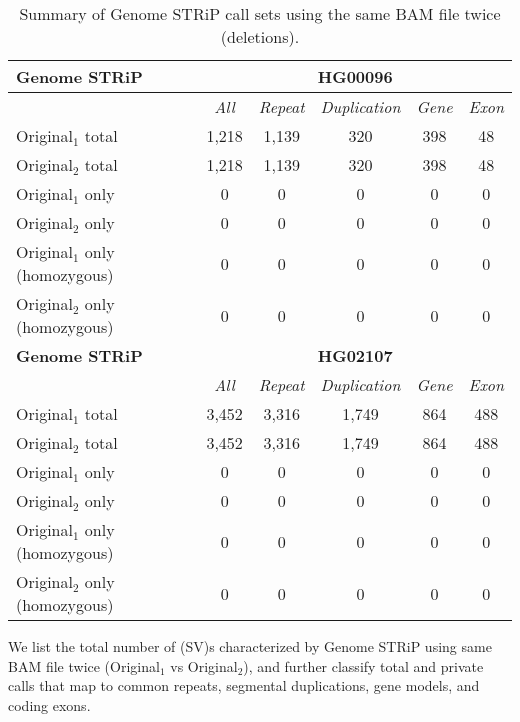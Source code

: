 \begin{table}[htb]
\caption{ Summary of Genome STRiP call sets using the same BAM file twice (deletions). }
\begin{center}
\begin{tabular}{|l|c||c|c|c|c|}
\hline
{\bf Genome STRiP} & \multicolumn{5}{|c|}{\bf HG00096} \\
\hline
\cline{2-6}
{\bf} & {\it All} & {\it Repeat} & {\it Duplication} & {\it Gene} & {\it Exon} \\
\hline
Original$_1$ total & 1,218 & 1,139 & 320 & 398 & 48 \\
\hline
Original$_2$ total & 1,218 & 1,139 & 320 & 398 & 48 \\
\hline
Original$_1$ only & 0 & 0 & 0 & 0 & 0\\ 
\hline
Original$_2$ only & 0 & 0 & 0 & 0 & 0\\
\hline
Original$_1$ only (homozygous) & 0 & 0 & 0 & 0 & 0\\ 
\hline
Original$_2$ only (homozygous) & 0 & 0 & 0 & 0 & 0\\  
\hline
\hline
{\bf Genome STRiP} & \multicolumn{5}{|c|}{\bf HG02107} \\
\hline
\cline{2-6}
{\bf} & {\it All} & {\it Repeat} & {\it Duplication} & {\it Gene} & {\it Exon} \\
\hline
Original$_1$ total & 3,452 & 3,316 & 1,749 & 864 & 488 \\
\hline
Original$_2$ total & 3,452 & 3,316 & 1,749 & 864 & 488 \\
\hline
Original$_1$ only & 0 & 0 & 0 & 0 & 0\\ 
\hline
Original$_2$ only & 0 & 0 & 0 & 0 & 0\\
\hline
Original$_1$ only (homozygous) & 0 & 0 & 0 & 0 & 0\\ 
\hline
Original$_2$ only (homozygous) & 0 & 0 & 0 & 0 & 0\\  
\hline
\end{tabular}
\end{center}
{\footnotesize We list the total number of (SV)s characterized by Genome STRiP using same BAM file twice (Original$_1$ vs Original$_2$), 
and further classify total and private calls that map to common repeats, segmental duplications, gene models, and coding exons.}
\label{supptab:orig-vs-orig2-svtoolkit}
\end{table}


